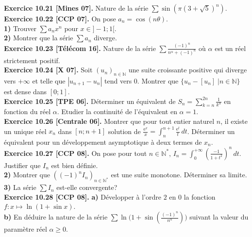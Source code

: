 \documentclass[a4paper,12pt,francais]{article}
\newcommand{\field}[1]{\mathbb{#1}}
\newcommand{\N}{\field{N}}
\newcommand{\e}{\mbox{e}}
\begin{document}
\noindent
{\bf Exercice 10.21 [Mines 07].} Nature de la série $\displaystyle \sum \sin \left( \pi (3+\sqrt{5})^n \right)$.\\

\noindent
{\bf Exercice 10.22 [CCP 07].} On pose $a_n=\cos(n \theta)$.\\
\indent
{\bf 1)} Trouver $\sum a_n x^n$ pour $x \in ]-1;1[$.\\
\indent
{\bf 2)} Montrer que la série $\sum a_n$ diverge.\\

\noindent
{\bf Exercice 10.23 [Télécom 16].} %
Nature de la série $\displaystyle \sum \frac{(-1)^n}{n^\alpha+(-1)^n}$ où $\alpha$ est un réel strictement positif.\\

\noindent
{\bf Exercice 10.24 [X 07].} Soit $(u_n)_{n \in \N}$ une suite croissante positive qui diverge vers $+\infty$ et telle que $|u_{n+1}-u_n|$ tend vers $0$. Montrer que $\{u_n-[u_n]\; | n \in \N\}$ est dense dans $[0;1]$.\\

\noindent
{\bf Exercice 10.25 [TPE 06].} Déterminer un équivalent de $S_n=\displaystyle \sum_{k=n}^{2n} \frac{1}{k^\alpha}$ en fonction du réel $\alpha$. Etudier la continuité de l'équivalent en $\alpha=1$.\\

\noindent
{\bf Exercice 10.26 [Centrale 06].} Montrer que pour tout entier naturel $n$, il existe un unique réel $x_n$ dans $[n;n+1]$ solution de $\frac{\e^x}{x}=\int_n^{n+1} \frac{\e^t}{t}\, dt$. Déterminer un équivalent pour un développement asymptotique à deux termes de $x_n$.\\

\noindent
{\bf Exercice 10.27 [CCP 08].} On pose pour tout $n\in \N^*$, $I_n=\displaystyle \int_0^{+\infty} \left({\frac{-1}{1+t^2}}\right)^n \, dt$.\\
 Justifier que $I_n$ est bien définie.\\
\indent
{\bf 2)} Montrer que $((-1)^n I_n)_{n \in \N^*}$ est une suite monotone. Déterminer sa limite.\\
\indent
{\bf 3)} La série $\sum I_n$ est-elle convergente?\\

\noindent
{\bf Exercice 10.28 [CCP 08].} {\bf a)} Développer à l'ordre $2$ en $0$ la fonction $f: x \mapsto \ln (1+\sin x)$.\\
{\bf b)} En déduire la nature de la série $\sum \ln \big( { 
1+ \sin \left(  \frac{(-1)^n}{n^\alpha} \right) } \big)$ suivant la valeur du paramètre réel $\alpha\geqslant 0$.\\
\end{document}
